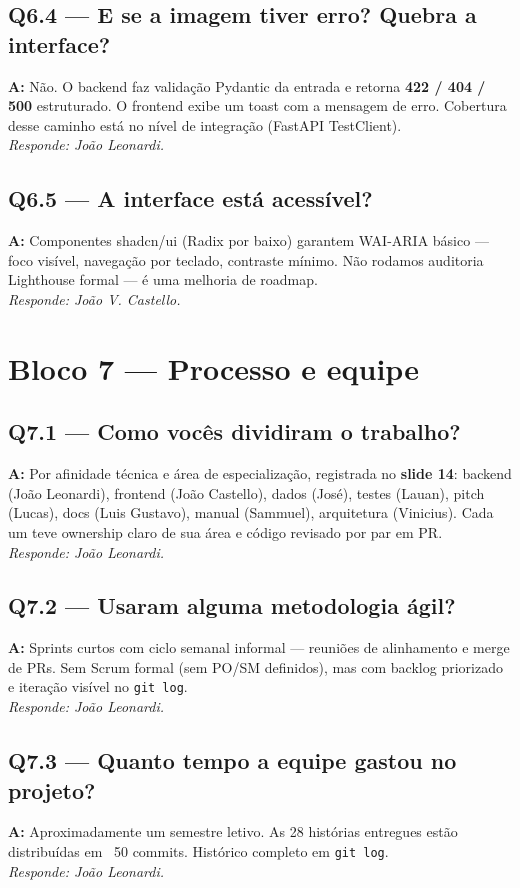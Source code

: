 \documentclass[12pt,a4paper]{article}
\begin{document}
\subsection*{Q6.4 — E se a imagem tiver erro? Quebra a interface?}
\textbf{A:} Não. O backend faz validação Pydantic da entrada e retorna
\textbf{422 / 404 / 500} estruturado. O frontend exibe um toast com a
mensagem de erro. Cobertura desse caminho está no nível de integração
(FastAPI TestClient).
\\[2pt] \textit{Responde: João Leonardi.}

\subsection*{Q6.5 — A interface está acessível?}
\textbf{A:} Componentes shadcn/ui (Radix por baixo) garantem WAI-ARIA básico
— foco visível, navegação por teclado, contraste mínimo. Não rodamos
auditoria Lighthouse formal — é uma melhoria de roadmap.
\\[2pt] \textit{Responde: João V. Castello.}

\section*{Bloco 7 — Processo e equipe}

\subsection*{Q7.1 — Como vocês dividiram o trabalho?}
\textbf{A:} Por afinidade técnica e área de especialização, registrada no
\textbf{slide 14}: backend (João Leonardi), frontend (João Castello), dados
(José), testes (Lauan), pitch (Lucas), docs (Luis Gustavo), manual (Sammuel),
arquitetura (Vinicius). Cada um teve ownership claro de sua área e código
revisado por par em PR.
\\[2pt] \textit{Responde: João Leonardi.}

\subsection*{Q7.2 — Usaram alguma metodologia ágil?}
\textbf{A:} Sprints curtos com ciclo semanal informal — reuniões de
alinhamento e merge de PRs. Sem Scrum formal (sem PO/SM definidos), mas com
backlog priorizado e iteração visível no \texttt{git log}.
\\[2pt] \textit{Responde: João Leonardi.}

\subsection*{Q7.3 — Quanto tempo a equipe gastou no projeto?}
\textbf{A:} Aproximadamente um semestre letivo. As 28 histórias entregues
estão distribuídas em ~50 commits. Histórico completo em \texttt{git log}.
\\[2pt] \textit{Responde: João Leonardi.}
\end{document}
